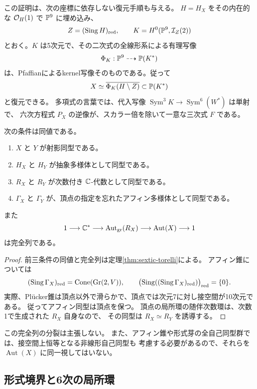 この証明は、次の座標に依存しない復元手順も与える。
$H=H_X$ をその内在的な $\mathcal O_H(1)$ で $\mathbb P^9$ に埋め込み、
\[
 Z=(\operatorname{Sing}H)_{\mathrm{red}},\qquad
 K=H^0(\mathbb P^9,\mathcal I_Z(2))
\]
とおく。$K$ は5次元で、その二次式の全線形系による有理写像
\[
 \Phi_K:\mathbb P^9\dashrightarrow\mathbb P(K^*)
\]
は、Pfaffianによるkernel写像そのものである。従って
\begin{equation}\label{eq:boundary-reconstruct-cubic}
                 X\simeq\overline{\Phi_K(H\setminus Z)}
                 \subset\mathbb P(K^*)
\end{equation}
と復元できる。
多項式の言葉では、代入写像
$\operatorname{Sym}^3K\to\operatorname{Sym}^6(W^*)$ は単射で、
六次方程式 $P_X$ の逆像が、スカラー倍を除いて一意な三次式 $F$ である。

\begin{theorem}[次数付き環と抽象アフィン錐]\label{cor:affine-sextic-torelli}
次の条件は同値である。
\begin{enumerate}
\item $X$ と $Y$ が射影同型である。
\item $H_X$ と $H_Y$ が抽象多様体として同型である。
\item $R_X$ と $R_Y$ が次数付き $\mathbb C$-代数として同型である。
\item $\Gamma_X$ と $\Gamma_Y$ が、頂点の指定を忘れたアフィン多様体として同型である。
\end{enumerate}
また
\[
 1\longrightarrow\mathbb C^*\longrightarrow\operatorname{Aut}_{\mathrm{gr}}(R_X)
 \longrightarrow\operatorname{Aut}(X)\longrightarrow1
\]
は完全列である。
\end{theorem}

\begin{proof}
前三条件の同値と完全列は定理\ref{thm:sextic-torelli}による。
アフィン錐については
\[
 (\operatorname{Sing}\Gamma_X)_{\mathrm{red}}
   =\operatorname{Cone}(\operatorname{Gr}(2,V)),\qquad
 \bigl(\operatorname{Sing}((\operatorname{Sing}\Gamma_X)_{\mathrm{red}})\bigr)_{\mathrm{red}}
   =\{0\}.
\]
実際、Pl\"ucker錐は頂点以外で滑らかで、頂点では次元7に対し接空間が10次元である。
従ってアフィン同型は頂点を保つ。
頂点の局所環の随伴次数環は、次数1で生成された $R_X$ 自身なので、
その同型は $R_X\simeq R_Y$ を誘導する。
\end{proof}

この完全列の分裂は主張しない。
また、アフィン錐や形式芽の全自己同型群では、接空間上恒等となる非線形自己同型も
考慮する必要があるので、それらを $\operatorname{Aut}(X)$ に同一視してはいない。

\subsection{形式境界と6次の局所環}

